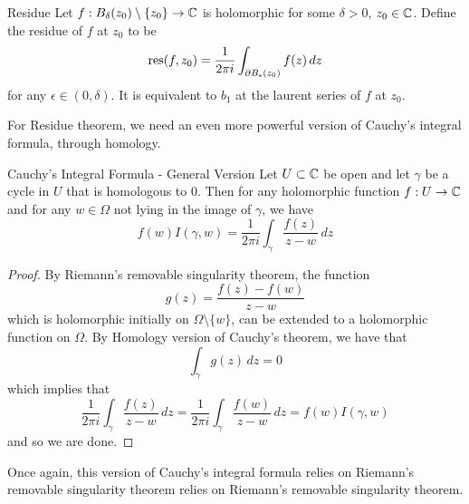 \documentclass[a4paper]{article}
\begin{document}
\begin{defn}{Residue}{} Let $f:B_\delta(z_0)\setminus\{z_0\}\to\mathbb{C}$ is holomorphic for some $\delta>0$, $z_0\in\mathbb{C}$. Define the residue of $f$ at $z_0$ to be $$\operatorname{res}(f,z_0)=\frac{1}{2\pi i}\int_{\partial B_{\epsilon}(z_0)}f(z)\,dz$$ for any $\epsilon\in(0,\delta)$. It is equivalent to $b_1$ at the laurent series of $f$ at $z_0$. 
\end{defn}

For Residue theorem, we need an even more powerful version of Cauchy's integral formula, through homology. 

\begin{thm}{Cauchy's Integral Formula - General Version}{} Let $U\subset\mathbb{C}$ be open and let $\gamma$ be a cycle in $U$ that is homologous to $0$. Then for any holomorphic function $f:U\to\mathbb{C}$ and for any $w\in\Omega$ not lying in the image of $\gamma$, we have $$f(w)I(\gamma,w)=\frac{1}{2\pi i}\int_\gamma\frac{f(z)}{z-w}\,dz$$ \tcbline
\begin{proof}
By Riemann's removable singularity theorem, the function $$g(z)=\frac{f(z)-f(w)}{z-w}$$ which is holomorphic initially on $\Omega\setminus\{w\}$, can be extended to a holomorphic function on $\Omega$. By Homology version of Cauchy's theorem, we have that $$\int_\gamma g(z)\,dz=0$$ which implies that $$\frac{1}{2\pi i}\int_\gamma\frac{f(z)}{z-w}\,dz=\frac{1}{2\pi i}\int_\gamma\frac{f(w)}{z-w}\,dz=f(w)I(\gamma,w)$$ and so we are done. 
\end{proof}
\end{thm}

Once again, this version of Cauchy's integral formula relies on Riemann's removable singularity theorem relies on Riemann's removable singularity theorem. 
\end{document}
